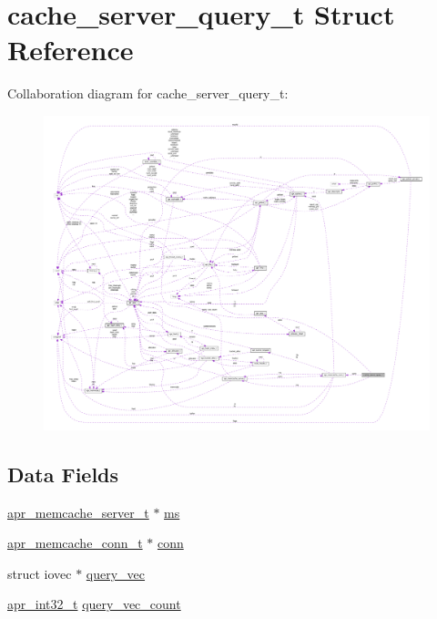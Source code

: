 \hypertarget{structcache__server__query__t}{}\section{cache\+\_\+server\+\_\+query\+\_\+t Struct Reference}
\label{structcache__server__query__t}


Collaboration diagram for cache\+\_\+server\+\_\+query\+\_\+t\+:
\nopagebreak
\begin{figure}[H]
\begin{center}
\leavevmode
\includegraphics[width=350pt]{structcache__server__query__t__coll__graph}
\end{center}
\end{figure}
\subsection*{Data Fields}
\begin{DoxyCompactItemize}
\item 
\hyperlink{structapr__memcache__server__t}{apr\+\_\+memcache\+\_\+server\+\_\+t} $\ast$ \hyperlink{structcache__server__query__t_a30a17a0a3e4281925c615d6e44e83526}{ms}
\item 
\hyperlink{structapr__memcache__conn__t}{apr\+\_\+memcache\+\_\+conn\+\_\+t} $\ast$ \hyperlink{structcache__server__query__t_a20ba37ad7f143a90ba00db10b47c85a4}{conn}
\item 
struct iovec $\ast$ \hyperlink{structcache__server__query__t_aecc1b2f44a4337ae8094afb9bc9e74d7}{query\+\_\+vec}
\item 
\hyperlink{group__apr__platform_ga21ef1e35fd3ff9be386f3cb20164ff02}{apr\+\_\+int32\+\_\+t} \hyperlink{structcache__server__query__t_af0d394bb44953b027cfb60faba34f45c}{query\+\_\+vec\+\_\+count}
\end{DoxyCompactItemize}


